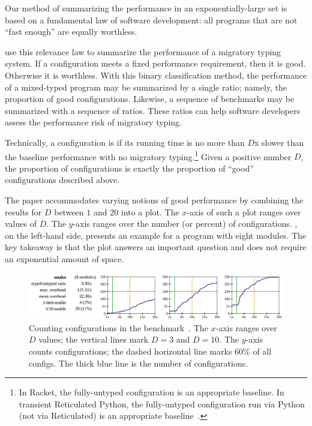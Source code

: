 

Our method of summarizing the performance in an exponentially-large set
 is based on a fundamental law of software development:
 all programs that are not ``fast enough'' are equally worthless.

\citet{tfgnvf-popl-2016} use this relevance law to summarize the performance
 of a migratory typing system.
If a configuration meets a fixed performance requirement, then it is good.
Otherwise it is worthless.
With this binary classification method, the performance of a mixed-typed
 program may be summarized by a single ratio; namely,
 the proportion of good configurations.
Likewise, a sequence of benchmarks may be summarized with a sequence of ratios.
These ratios can help software developers assess the performance risk of
 migratory typing.

Technically, a configuration is 
 if its running time is no more than $D$x slower than the baseline performance
 with no migratory typing.\footnote{In Racket, the fully-untyped configuration
 is an appropriate baseline. In transient Reticulated Python, the fully-untyped configuration
 run via Python (not via Reticulated) is an appropriate baseline~\cite{gm-pepm-2018}.}
Given a positive number $D$, the proportion of  configurations
 is exactly the proportion of ``good'' configurations described above.

The paper accommodates varying notions of good performance by combining the
 results for $D$ between $1$ and $20$ into a plot.
The $x$-axis of such a plot ranges over values of $D$.
The $y$-axis ranges over the number (or percent) of configurations.
, on the left-hand side, presents an example
 for a program with eight modules.
The key takeaway is that the plot answers an important question and does
 not require an exponential amount of space.

\begin{figure}[h]
\includegraphics[width=0.96\columnwidth]{src/snake-popl.png}
\caption{Counting  configurations in the 
         benchmark~\cite{tfgnvf-popl-2016}. The $x$-axis ranges over $D$ values;
         the vertical lines mark $D=3$ and $D=10$.
         The $y$-axis counts configurations; the dashed horizontal line marks
         $60$\% of all configs.
         The thick blue line is the number of  configurations.}
\label{fig:snake-popl}
\end{figure}

